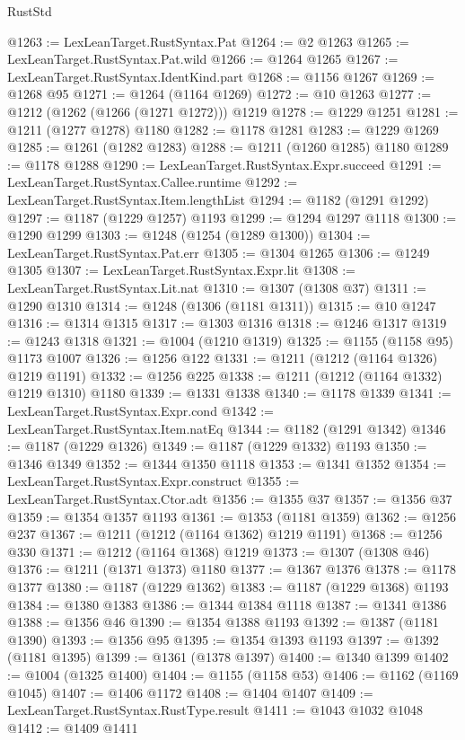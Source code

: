 \begin{lexlean}{RustStd}
\begin{coremodule}
@1263 := LexLeanTarget.RustSyntax.Pat
@1264 := @2 @1263
@1265 := LexLeanTarget.RustSyntax.Pat.wild
@1266 := @1264 @1265
@1267 := LexLeanTarget.RustSyntax.IdentKind.part
@1268 := @1156 @1267
@1269 := @1268 @95
@1271 := @1264 (@1164 @1269)
@1272 := @10 @1263
@1277 := @1212 (@1262 (@1266 (@1271 @1272))) @1219
@1278 := @1229 @1251
@1281 := @1211 (@1277 @1278) @1180
@1282 := @1178 @1281
@1283 := @1229 @1269
@1285 := @1261 (@1282 @1283)
@1288 := @1211 (@1260 @1285) @1180
@1289 := @1178 @1288
@1290 := LexLeanTarget.RustSyntax.Expr.succeed
@1291 := LexLeanTarget.RustSyntax.Callee.runtime
@1292 := LexLeanTarget.RustSyntax.Item.lengthList
@1294 := @1182 (@1291 @1292)
@1297 := @1187 (@1229 @1257) @1193
@1299 := @1294 @1297 @1118
@1300 := @1290 @1299
@1303 := @1248 (@1254 (@1289 @1300))
@1304 := LexLeanTarget.RustSyntax.Pat.err
@1305 := @1304 @1265
@1306 := @1249 @1305
@1307 := LexLeanTarget.RustSyntax.Expr.lit
@1308 := LexLeanTarget.RustSyntax.Lit.nat
@1310 := @1307 (@1308 @37)
@1311 := @1290 @1310
@1314 := @1248 (@1306 (@1181 @1311))
@1315 := @10 @1247
@1316 := @1314 @1315
@1317 := @1303 @1316
@1318 := @1246 @1317
@1319 := @1243 @1318
@1321 := @1004 (@1210 @1319)
@1325 := @1155 (@1158 @95) @1173 @1007
@1326 := @1256 @122
@1331 := @1211 (@1212 (@1164 @1326) @1219 @1191)
@1332 := @1256 @225
@1338 := @1211 (@1212 (@1164 @1332) @1219 @1310) @1180
@1339 := @1331 @1338
@1340 := @1178 @1339
@1341 := LexLeanTarget.RustSyntax.Expr.cond
@1342 := LexLeanTarget.RustSyntax.Item.natEq
@1344 := @1182 (@1291 @1342)
@1346 := @1187 (@1229 @1326)
@1349 := @1187 (@1229 @1332) @1193
@1350 := @1346 @1349
@1352 := @1344 @1350 @1118
@1353 := @1341 @1352
@1354 := LexLeanTarget.RustSyntax.Expr.construct
@1355 := LexLeanTarget.RustSyntax.Ctor.adt
@1356 := @1355 @37
@1357 := @1356 @37
@1359 := @1354 @1357 @1193
@1361 := @1353 (@1181 @1359)
@1362 := @1256 @237
@1367 := @1211 (@1212 (@1164 @1362) @1219 @1191)
@1368 := @1256 @330
@1371 := @1212 (@1164 @1368) @1219
@1373 := @1307 (@1308 @46)
@1376 := @1211 (@1371 @1373) @1180
@1377 := @1367 @1376
@1378 := @1178 @1377
@1380 := @1187 (@1229 @1362)
@1383 := @1187 (@1229 @1368) @1193
@1384 := @1380 @1383
@1386 := @1344 @1384 @1118
@1387 := @1341 @1386
@1388 := @1356 @46
@1390 := @1354 @1388 @1193
@1392 := @1387 (@1181 @1390)
@1393 := @1356 @95
@1395 := @1354 @1393 @1193
@1397 := @1392 (@1181 @1395)
@1399 := @1361 (@1378 @1397)
@1400 := @1340 @1399
@1402 := @1004 (@1325 @1400)
@1404 := @1155 (@1158 @53)
@1406 := @1162 (@1169 @1045)
@1407 := @1406 @1172
@1408 := @1404 @1407
@1409 := LexLeanTarget.RustSyntax.RustType.result
@1411 := @1043 @1032 @1048
@1412 := @1409 @1411

\end{coremodule}
\end{lexlean}
